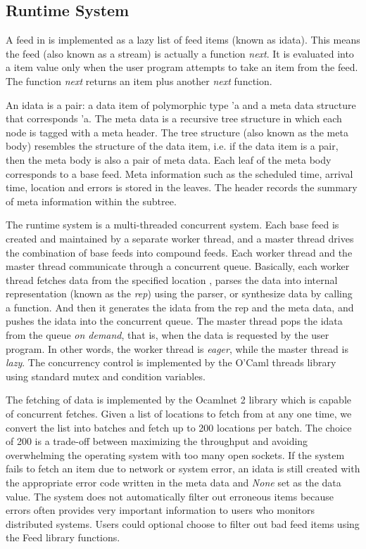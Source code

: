 \subsection{Runtime System}
A feed in \padsd{} is implemented as a lazy list of feed
items (known as idata). This means the feed (also known as a stream) 
is actually a function {\em next}. It is evaluated into
a item value only when the user program attempts to take an
item from the feed. The function {\em next} returns an
item plus another {\em next} function. 

An idata is a pair: a data item of polymorphic type 'a and 
a meta data structure that corresponds 'a. 
The meta data is a recursive tree structure in which
each node is tagged with a meta header. 
The tree structure (also known as the meta body) resembles 
the structure of the data item, i.e.  if the data item is a pair, 
then the meta body is also a pair of meta data. Each leaf
of the meta body corresponds to a base feed. Meta information
such as the scheduled time, arrival time, location and 
errors is stored in the leaves. The header records the summary 
of meta information within the subtree. 

The \padsd{} runtime system is a multi-threaded concurrent
system. Each base feed is created and maintained by a separate 
worker thread, and a master thread drives the combination of 
base feeds into compound feeds. Each worker thread and the 
master thread communicate through a concurrent queue.
Basically, each worker thread fetches data from the specified
location , parses the data into internal representation 
(known as the {\em rep})
using the \padsml parser, or synthesize data by calling a function.
And then it generates the idata from the rep and the meta data,
and pushes the idata into the concurrent queue.
The master thread pops the idata from the queue {\em on demand}, that is,
when the data is requested by the user program. In other words,
the worker thread is {\em eager}, while the master thread is {\em lazy}.
The concurrency control is implemented by the O'Caml threads
library using standard mutex and condition variables.

The fetching of data is implemented by
the Ocamlnet 2 library which is capable of concurrent fetches. 
Given a list of locations to fetch from at any one time, 
we convert the list into batches and fetch up to 200 locations
per batch. The choice of 200 is a trade-off between maximizing
the throughput and avoiding overwhelming the operating system
with too many open sockets. If the system fails to fetch an
item due to network or system error, an idata is still created
with the appropriate error code written in the meta data and
{\em None} set as the data value. The \padsd{} system does not 
automatically filter out erroneous items because errors often 
provides very important information to users who monitors 
distributed systems. Users could optional choose to filter
out bad feed items using the Feed library functions.

